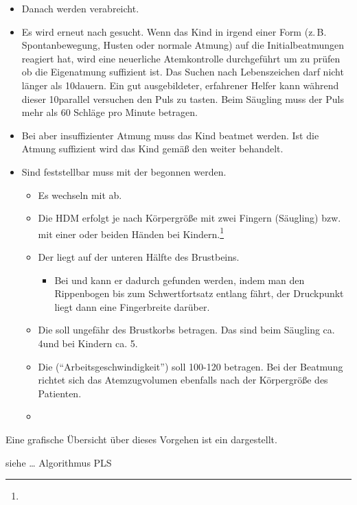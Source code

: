 {\begin{itemize}
  Mundhöhle inspiziert und etwaige Fremdkörper
  entfernt.
  \item Danach werden  verabreicht.
  \item Es wird erneut nach  gesucht. Wenn
  das Kind in irgend einer Form (z.\,B.
  Spontanbewegung, Husten oder normale Atmung)
  auf die Initialbeatmungen reagiert hat, wird eine
  neuerliche Atemkontrolle durchgeführt um zu prüfen ob die
  Eigenatmung suffizient ist. Das Suchen nach Lebenszeichen
  darf nicht länger als 10\Sec* dauern. Ein gut
  ausgebildeter, erfahrener Helfer kann während dieser
  10\Sec* parallel versuchen den Puls zu tasten. Beim
  Säugling muss der Puls mehr als 60 Schläge pro Minute
  betragen.
  \item Bei  aber
  insuffizienter Atmung muss das Kind beatmet werden. Ist
  die Atmung suffizient wird das Kind gemäß den {\TxMassVit}
  weiter behandelt.
  \item
  Sind  feststellbar muss mit der
   begonnen werden.
  \begin{itemize}
    \item Es
    wechseln  mit  ab.
    \item
    Die HDM
    erfolgt je nach Körpergröße mit zwei Fingern (Säugling)
    bzw. mit einer oder beiden Händen bei
    Kindern.\footnote{}
    \item
    Der  liegt auf der unteren Hälfte des Brustbeins. 
    \begin{itemize}
      \item Bei  und  kann er dadurch
      gefunden werden, indem man den Rippenbogen bis zum Schwertfortsatz
      entlang fährt, der Druckpunkt liegt dann eine Fingerbreite darüber.
    \end{itemize}
    \item
    Die
     soll ungefähr  des
    Brustkorbs betragen. Das sind beim Säugling ca. 4\CM* und
    bei Kindern ca. 5\CM*.
    \item
    Die 
    (\enquote{Arbeitsgeschwindigkeit}) soll
    100-120\PerMin*{} betragen. Bei der Beatmung richtet sich
    das Atemzugvolumen ebenfalls nach der Körpergröße des
    Patienten.
    \item {}
  \end{itemize}
\end{itemize}
Eine grafische Übersicht über dieses Vorgehen ist ein
 dargestellt. \cite{Erc2010Sec6}

}{ 
siehe  \ldots{}
Algorithmus PLS 
}{}{}{}

